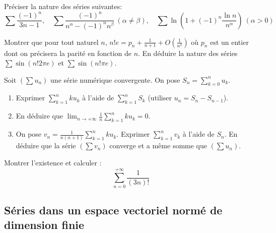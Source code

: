 \begin{exercice}
    Préciser la nature des séries suivantes:
    \[\sum\frac{(-1)^{n}}{3n-1}, \quad \sum\frac{(-1)^{n}}{n^{\alpha}-(-1)^{n}n^{\beta}} \ (\alpha\ne\beta), \quad \sum \ln\left(1+(-1)^{n}\frac{\ln n}{n^{\alpha}}\right) \ (\alpha>0)\]
\end{exercice}

\begin{exercice}
    Montrer que pour tout naturel $n$, $n!e=p_{n}+\frac{1}{n+1}+O\left(\frac{1}{n^{2}}\right)$ 
    où $p_{n}$ est un entier dont on précisera la parité en fonction de $n$.
    En déduire la nature des séries $\sum \sin(n!2\pi e)$ et $\sum \sin(n!\pi e)$.
\end{exercice}

\begin{exercice}
Soit $(\sum u_{n})$ une série numérique convergente. On pose $\displaystyle S_{n}=\sum_{k=0}^{n}u_{k}$.
\begin{enumerate}
    \item Exprimer $\displaystyle\sum_{k=1}^{n}ku_{k}$ à l'aide de $\displaystyle\sum_{k=1}^{n}S_{k}$ (utiliser $u_n = S_n - S_{n-1}$).
    \item En déduire que $\displaystyle\lim_{n\rightarrow+\infty}\frac{1}{n}\sum_{k=1}^{n}ku_{k}=0$.
    \item On pose $\displaystyle v_{n}=\frac{1}{n(n+1)}\sum_{k=1}^{n}ku_{k}$.
        Exprimer $\displaystyle\sum_{k=1}^{n}v_{k}$ à l'aide de $S_{n}$.
        En déduire que la série $(\sum v_{n})$ converge et a même somme que $(\sum u_{n})$.
\end{enumerate}
\end{exercice}

\begin{exercice}
Montrer l'existence et calculer : \[\sum_{n=0}^{+\infty} \frac{1}{(3n)!}\]
\end{exercice}
    
\subsection{Séries dans un espace vectoriel normé de dimension finie}

